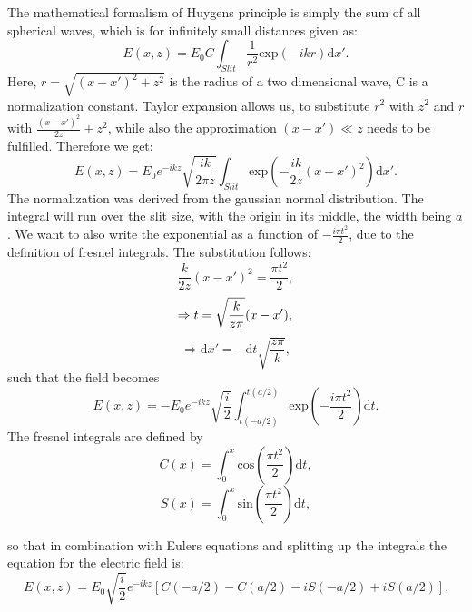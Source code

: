 The mathematical formalism of Huygens principle is simply the sum of all spherical waves, which is for infinitely small distances given as:
\begin{equation}
E(x,z) = E_0 C \int_{Slit} \frac{1}{r^2} \mathrm{exp}(-ikr)\mathrm{d}x'.
\end{equation}
Here, $r=\sqrt{(x-x')^2 + z^2}$ is the radius of a two dimensional wave, C is a normalization constant.
Taylor expansion allows us, to substitute $r^2$ with $z^2$ and $r$ with $\frac{(x-x')^2}{2z} + z^2$, while also the approximation $(x-x') \ll z$ needs to be fulfilled. Therefore we get:
\begin{equation}
E(x,z) = E_0 e^{-ikz}\sqrt{\frac{ik}{2\pi z}}\int_{Slit} \mathrm{exp}(-\frac{ik}{2z}(x-x')^2)\mathrm{d}x'.
\end{equation}
The normalization was derived from the gaussian normal distribution. The integral will run over the slit size, with the origin in its middle, the width being $a$.
We want to also write the exponential as a function of $-\frac{i\pi t^2}{2}$, due to the definition of fresnel integrals. The substitution follows:
\begin{equation}
\frac{k}{2z}(x-x')^2 = \frac{\pi t^2}{2},
\end{equation}
\begin{equation}
\Rightarrow t = \sqrt{\frac{k}{z\pi}}(x-x'), \\
\end{equation}
\begin{equation}
\Rightarrow \mathrm{d}x' = -\mathrm{d}t \sqrt{\frac{z\pi}{k}},
\end{equation}
such that the field becomes
\begin{equation}
E(x,z) = -E_0 e^{-ikz}\sqrt{\frac{i}{2}}\int_{t(-a/2)}^{t(a/2)} \mathrm{exp}(-\frac{i\pi t^2}{2})\mathrm{d}t.
\end{equation}
The fresnel integrals are defined by
\begin{equation}
C(x) = \int_0^x \mathrm{cos}(\frac{\pi t^2}{2})\mathrm{d}t,
\end{equation}
\begin{equation}
S(x) = \int_0^x \mathrm{sin}(\frac{\pi t^2}{2})\mathrm{d}t,
\end{equation}

so that in combination with Eulers equations and splitting up the integrals the equation for the electric field is:
\begin{equation}
E(x,z) = E_0 \sqrt{\frac{i}{2}} e^{-ikz} \left [ C(-a/2) - C(a/2) - iS(-a/2) + iS(a/2) \right ].
\end{equation}

